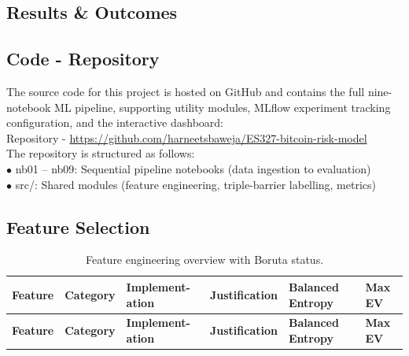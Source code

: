\begin{appendices}

\section{Results \& Outcomes}
\label{app: Results}
\subsection{Code - Repository}
The source code for this project is hosted on GitHub and contains the full nine-notebook ML pipeline, supporting utility modules, MLflow experiment tracking configuration, and the interactive dashboard:\\
Repository - \url{https://github.com/harneetsbaweja/ES327-bitcoin-risk-model}\\
The repository is structured as follows:\\
$\bullet$ nb01 -- nb09: Sequential pipeline notebooks (data ingestion to evaluation)\\
$\bullet$ src/: Shared modules (feature engineering, triple-barrier labelling, metrics)

\subsection{Feature Selection}
{  
\setlength{\LTleft}{-5pt}
\setlength{\LTright}{\fill}
\setlength{\LTpre}{-1pt}
\setlength{\LTpost}{-5pt}
\renewcommand{\arraystretch}{0.75}
\begin{longtable}{| 
    >{\raggedright\arraybackslash\leftskip=-4.5pt}p{} | 
    >{\raggedright\arraybackslash\leftskip=-4.5pt}p{} | 
    >{\raggedright\arraybackslash\leftskip=-4.5pt}p{} | 
    >{\raggedright\arraybackslash\leftskip=-4.5pt}p{} | 
    >{\centering\arraybackslash}p{} | 
    >{\centering\arraybackslash}p{} |}
\caption{Feature engineering overview with Boruta status.\label{tab:features_full}}\\
\hline
\textbf{Feature} & 
\textbf{Category} & 
\textbf{Implement}\newline \textbf{-ation} & 
\textbf{Justification} & 
\textbf{Balanced Entropy} & 
\textbf{Max EV} \\ 
\hline
\endfirsthead

\hline
\textbf{Feature} & 
\textbf{Category} & 
\textbf{Implement}\newline \textbf{-ation} & 
\textbf{Justification} & 
\textbf{Balanced Entropy} & 
\textbf{Max EV} \\ 
\hline
\endhead


\end{longtable}}
\end{appendices}

